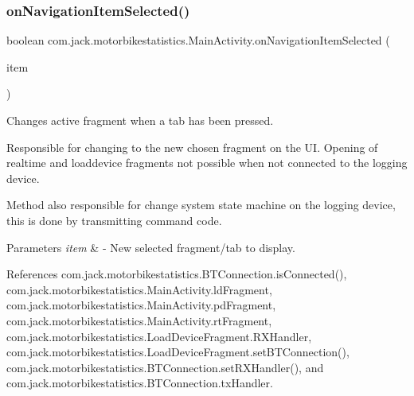 \subsubsection{\texorpdfstring{on\+Navigation\+Item\+Selected()}{onNavigationItemSelected()}}
{\footnotesize\ttfamily boolean com.\+jack.\+motorbikestatistics.\+Main\+Activity.\+on\+Navigation\+Item\+Selected (\begin{DoxyParamCaption}\item[{Menu\+Item}]{item }\end{DoxyParamCaption})\hspace{0.3cm}{\ttfamily [inline]}}



Changes active fragment when a tab has been pressed. 

Responsible for changing to the new chosen fragment on the UI. Opening of realtime and loaddevice fragments not possible when not connected to the logging device.

Method also responsible for change system state machine on the logging device, this is done by transmitting command code.


\begin{DoxyParams}{Parameters}
{\em item} & -\/ New selected fragment/tab to display. \\
\hline
\end{DoxyParams}


References com.\+jack.\+motorbikestatistics.\+B\+T\+Connection.\+is\+Connected(), com.\+jack.\+motorbikestatistics.\+Main\+Activity.\+ld\+Fragment, com.\+jack.\+motorbikestatistics.\+Main\+Activity.\+pd\+Fragment, com.\+jack.\+motorbikestatistics.\+Main\+Activity.\+rt\+Fragment, com.\+jack.\+motorbikestatistics.\+Load\+Device\+Fragment.\+R\+X\+Handler, com.\+jack.\+motorbikestatistics.\+Load\+Device\+Fragment.\+set\+B\+T\+Connection(), com.\+jack.\+motorbikestatistics.\+B\+T\+Connection.\+set\+R\+X\+Handler(), and com.\+jack.\+motorbikestatistics.\+B\+T\+Connection.\+tx\+Handler.


